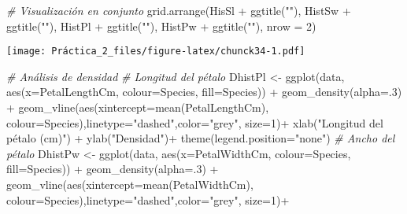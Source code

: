 \documentclass[
]{article}
\newenvironment{Shaded}{\begin{snugshade}}{\end{snugshade}}
\newcommand{\AttributeTok}[1]{\textcolor[rgb]{0.77,0.63,0.00}{#1}}
\newcommand{\CommentTok}[1]{\textcolor[rgb]{0.56,0.35,0.01}{\textit{#1}}}
\newcommand{\DecValTok}[1]{\textcolor[rgb]{0.00,0.00,0.81}{#1}}
\newcommand{\FunctionTok}[1]{\textcolor[rgb]{0.00,0.00,0.00}{#1}}
\newcommand{\NormalTok}[1]{#1}
\newcommand{\OtherTok}[1]{\textcolor[rgb]{0.56,0.35,0.01}{#1}}
\newcommand{\SpecialCharTok}[1]{\textcolor[rgb]{0.00,0.00,0.00}{#1}}
\newcommand{\StringTok}[1]{\textcolor[rgb]{0.31,0.60,0.02}{#1}}
\begin{document}
\begin{Shaded}
\begin{Highlighting}[]
\CommentTok{\# Visualización en conjunto}
\FunctionTok{grid.arrange}\NormalTok{(HisSl }\SpecialCharTok{+} \FunctionTok{ggtitle}\NormalTok{(}\StringTok{""}\NormalTok{),}
\NormalTok{             HistSw }\SpecialCharTok{+} \FunctionTok{ggtitle}\NormalTok{(}\StringTok{""}\NormalTok{),}
\NormalTok{             HistPl }\SpecialCharTok{+} \FunctionTok{ggtitle}\NormalTok{(}\StringTok{""}\NormalTok{),}
\NormalTok{             HistPw  }\SpecialCharTok{+} \FunctionTok{ggtitle}\NormalTok{(}\StringTok{""}\NormalTok{),}
             \AttributeTok{nrow =} \DecValTok{2}\NormalTok{)}
\end{Highlighting}
\end{Shaded}

\texttt{[image: Práctica\_2\_files/figure-latex/chunck34-1.pdf]}

\begin{Shaded}
\begin{Highlighting}[]
\CommentTok{\# Análisis de densidad}
\CommentTok{\# Longitud del pétalo}
\NormalTok{DhistPl }\OtherTok{\textless{}{-}} \FunctionTok{ggplot}\NormalTok{(data, }\FunctionTok{aes}\NormalTok{(}\AttributeTok{x=}\NormalTok{PetalLengthCm, }\AttributeTok{colour=}\NormalTok{Species, }\AttributeTok{fill=}\NormalTok{Species)) }\SpecialCharTok{+}
  \FunctionTok{geom\_density}\NormalTok{(}\AttributeTok{alpha=}\NormalTok{.}\DecValTok{3}\NormalTok{) }\SpecialCharTok{+}
  \FunctionTok{geom\_vline}\NormalTok{(}\FunctionTok{aes}\NormalTok{(}\AttributeTok{xintercept=}\FunctionTok{mean}\NormalTok{(PetalLengthCm),  }\AttributeTok{colour=}\NormalTok{Species),}\AttributeTok{linetype=}\StringTok{"dashed"}\NormalTok{,}\AttributeTok{color=}\StringTok{"grey"}\NormalTok{, }\AttributeTok{size=}\DecValTok{1}\NormalTok{)}\SpecialCharTok{+}
  \FunctionTok{xlab}\NormalTok{(}\StringTok{"Longitud del pétalo (cm)"}\NormalTok{) }\SpecialCharTok{+}  
  \FunctionTok{ylab}\NormalTok{(}\StringTok{"Densidad"}\NormalTok{)}\SpecialCharTok{+}
  \FunctionTok{theme}\NormalTok{(}\AttributeTok{legend.position=}\StringTok{"none"}\NormalTok{)}
\CommentTok{\# Ancho del pétalo}
\NormalTok{DhistPw }\OtherTok{\textless{}{-}} \FunctionTok{ggplot}\NormalTok{(data, }\FunctionTok{aes}\NormalTok{(}\AttributeTok{x=}\NormalTok{PetalWidthCm, }\AttributeTok{colour=}\NormalTok{Species, }\AttributeTok{fill=}\NormalTok{Species)) }\SpecialCharTok{+}
  \FunctionTok{geom\_density}\NormalTok{(}\AttributeTok{alpha=}\NormalTok{.}\DecValTok{3}\NormalTok{) }\SpecialCharTok{+}
  \FunctionTok{geom\_vline}\NormalTok{(}\FunctionTok{aes}\NormalTok{(}\AttributeTok{xintercept=}\FunctionTok{mean}\NormalTok{(PetalWidthCm),  }\AttributeTok{colour=}\NormalTok{Species),}\AttributeTok{linetype=}\StringTok{"dashed"}\NormalTok{,}\AttributeTok{color=}\StringTok{"grey"}\NormalTok{, }\AttributeTok{size=}\DecValTok{1}\NormalTok{)}\SpecialCharTok{+}

\end{Highlighting}
\end{Shaded}
\end{document}
